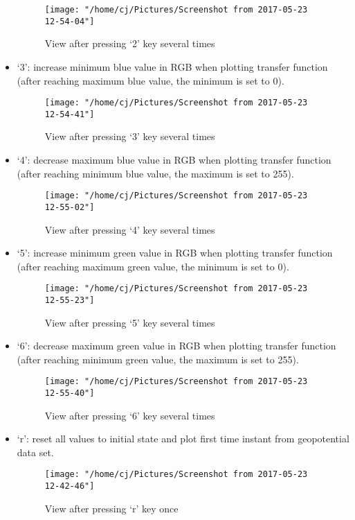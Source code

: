 \documentclass{article}
\begin{document}
\begin{itemize}
  \begin{figure}[H]
    \centering
    \texttt{[image: "/home/cj/Pictures/Screenshot from 2017-05-23 12-54-04"]}
    \caption{View after pressing `2' key several times}
  \end{figure}

  \item `3': increase minimum blue value in RGB when plotting transfer function (after reaching maximum blue value, the minimum is set to 0).

  \begin{figure}[H]
    \centering
    \texttt{[image: "/home/cj/Pictures/Screenshot from 2017-05-23 12-54-41"]}
    \caption{View after pressing `3' key several times}
  \end{figure}

  \item `4': decrease maximum blue value in RGB when plotting transfer function (after reaching minimum blue value, the maximum is set to 255).

  \begin{figure}[H]
    \centering
    \texttt{[image: "/home/cj/Pictures/Screenshot from 2017-05-23 12-55-02"]}
    \caption{View after pressing `4' key several times}
  \end{figure}

  \item `5': increase minimum green value in RGB when plotting transfer function (after reaching maximum green value, the minimum is set to 0).

  \begin{figure}[H]
    \centering
    \texttt{[image: "/home/cj/Pictures/Screenshot from 2017-05-23 12-55-23"]}
    \caption{View after pressing `5' key several times}
  \end{figure}

  \item `6': decrease maximum green value in RGB when plotting transfer function (after reaching minimum green value, the maximum is set to 255).

  \begin{figure}[H]
    \centering
    \texttt{[image: "/home/cj/Pictures/Screenshot from 2017-05-23 12-55-40"]}
    \caption{View after pressing `6' key several times}
  \end{figure}

  \item `r': reset all values to initial state and plot first time instant from geopotential data set.

  \begin{figure}[H]
    \centering
    \texttt{[image: "/home/cj/Pictures/Screenshot from 2017-05-23 12-42-46"]}
    \caption{View after pressing `r' key once}
  \end{figure}

\end{itemize}
\end{document}
